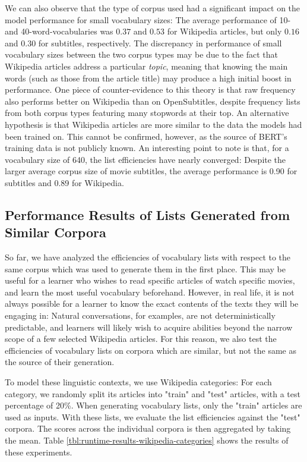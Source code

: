 We can also observe that the type of corpus used had a significant impact on the model performance for small vocabulary sizes:
The average performance of 10- and 40-word-vocabularies was $0.37$ and $0.53$ for Wikipedia articles, but only $0.16$ and $0.30$ for subtitles, respectively.
The discrepancy in performance of small vocabulary sizes between the two corpus types may be due to the fact that Wikipedia articles address a particular \textit{topic}, meaning that knowing the main words (such as those from the article title) may produce a high initial boost in performance.
One piece of counter-evidence to this theory is that raw frequency also performs better on Wikipedia than on OpenSubtitles, despite frequency lists from both corpus types featuring many stopwords at their top.
An alternative hypothesis is that Wikipedia articles are more similar to the data the models had been trained on.
This cannot be confirmed, however, as the source of BERT's training data is not publicly known.
An interesting point to note is that, for a vocabulary size of 640, the list efficiencies have nearly converged:
Despite the larger average corpus size of movie subtitles, the average performance is 0.90 for subtitles and 0.89 for Wikipedia.

\subsection{Performance Results of Lists Generated from Similar Corpora}
So far, we have analyzed the efficiencies of vocabulary lists with respect to the same corpus which was used to generate them in the first place.
This may be useful for a learner who wishes to read specific articles of watch specific movies, and learn the most useful vocabulary beforehand.
However, in real life, it is not always possible for a learner to know the exact contents of the texts they will be engaging in:
Natural conversations, for examples, are not deterministically predictable, and learners will likely wish to acquire abilities beyond the narrow scope of a few selected Wikipedia articles.
For this reason, we also test the efficiencies of vocabulary lists on corpora which are similar, but not the same as the source of their generation.

To model these linguistic contexts, we use Wikipedia categories:
For each category, we randomly split its articles into "train" and "test" articles, with a test percentage of 20\%.
When generating vocabulary lists, only the "train" articles are used as inputs.
With these lists, we evaluate the list efficiencies against the "test" corpora.
The scores across the individual corpora is then aggregated by taking the mean.
Table \ref{tbl:runtime-results-wikipedia-categories} shows the results of these experiments.

